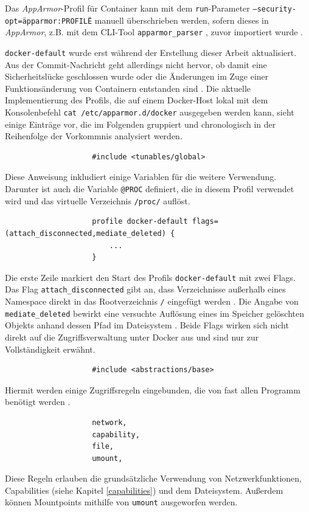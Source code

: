 \documentclass[../main.tex]{subfiles}
\begin{document}
{				Das \emph{AppArmor}-Profil für Container kann mit dem \texttt{run}-Parameter \texttt{--security-opt=\"apparmor:PROFILE\"} manuell überschrieben werden, sofern dieses in \emph{AppArmor}, z.B. mit dem \acrshort{CLI}-Tool \texttt{apparmor\_parser} \cite{apparmorParser}, zuvor importiert wurde \cite{dockerRun}.

				\texttt{docker-default} wurde erst während der Erstellung dieser Arbeit aktualisiert. Aus der Commit-Nachricht geht allerdings nicht hervor, ob damit eine Sicherheitslücke geschlossen wurde oder die Änderungen im Zuge einer Funktionsänderung von Containern entstanden sind \cite{githubAppArmorProfileContainerFix}. Die aktuelle Implementierung des Profils, die auf einem Docker-Host lokal mit dem Konsolenbefehl \texttt{cat /etc/apparmor.d/docker} ausgegeben werden kann, sieht einige Einträge vor, die im Folgenden gruppiert und chronologisch in der Reihenfolge der Vorkommnis analysiert werden.

				\begin{lstlisting}
					#include <tunables/global>
				\end{lstlisting}
				Diese Anweisung inkludiert einige Variablen für die weitere Verwendung. Darunter ist auch die Variable \texttt{@{PROC}} definiert, die in diesem Profil verwendet wird und das virtuelle Verzeichnis \texttt{/proc/} auflöst.

				\begin{lstlisting}
					profile docker-default flags=(attach_disconnected,mediate_deleted) {
						...
					}
				\end{lstlisting}
				Die erste Zeile markiert den Start des Profils \texttt{docker-default} mit zwei Flags. Das Flag \texttt{attach\_disconnected} gibt an, dass Verzeichnisse außerhalb eines Namespace direkt in das Rootverzeichnis \texttt{/} eingefügt werden \cite{apparmorPolicyReference}. Die Angabe von \texttt{mediate\_deleted} bewirkt eine versuchte Auflösung eines im Speicher gelöschten Objekts anhand dessen Pfad im Dateisystem \cite{apparmorFAQ}. Beide Flags wirken sich nicht direkt auf die Zugriffsverwaltung unter Docker aus und sind nur zur Vollständigkeit erwähnt.

				\begin{lstlisting}
					#include <abstractions/base>
				\end{lstlisting}
				Hiermit werden einige Zugriffsregeln eingebunden, die von fast allen Programm benötigt werden \cite[S.100]{SELinuxApparmor}.

				\begin{lstlisting}
					network,
					capability,
					file,
					umount,
				\end{lstlisting}
				Diese Regeln erlauben die grundsätzliche Verwendung von Netzwerkfunktionen, Capabilities (siehe Kapitel \ref{capabilities}) und dem Dateisystem. Außerdem können Mountpoints mithilfe von \texttt{umount} ausgeworfen werden.

}
\end{document}
